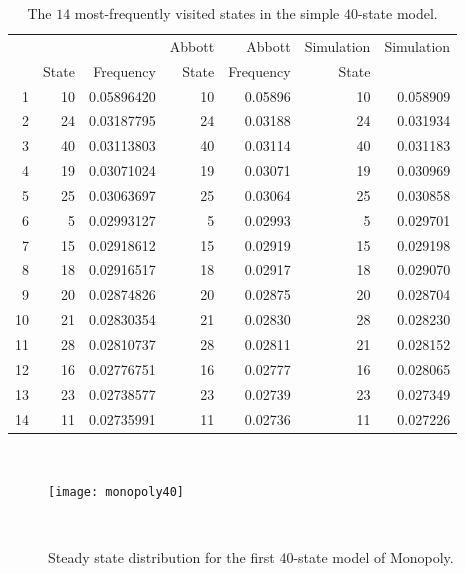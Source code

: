 \documentclass[12pt]{article}
\begin{document}
\begin{table}
    \centering
    \begin{tabular}{rrrrrrr}
           &       &            & Abbott & Abbott    & Simulation & Simulation \\ 
           & State & Frequency  & State  & Frequency & State      &            \\ 
        1  & 10    & 0.05896420 & 10     & 0.05896   & 10         & 0.058909   \\ 
        2  & 24    & 0.03187795 & 24     & 0.03188   & 24         & 0.031934   \\ 
        3  & 40    & 0.03113803 & 40     & 0.03114   & 40         & 0.031183   \\ 
        4  & 19    & 0.03071024 & 19     & 0.03071   & 19         & 0.030969   \\ 
        5  & 25    & 0.03063697 & 25     & 0.03064   & 25         & 0.030858   \\ 
        6  & 5     & 0.02993127 & 5      & 0.02993   & 5          & 0.029701   \\ 
        7  & 15    & 0.02918612 & 15     & 0.02919   & 15         & 0.029198   \\ 
        8  & 18    & 0.02916517 & 18     & 0.02917   & 18         & 0.029070   \\ 
        9  & 20    & 0.02874826 & 20     & 0.02875   & 20         & 0.028704   \\ 
        10 & 21    & 0.02830354 & 21     & 0.02830   & 28         & 0.028230   \\ 
        11 & 28    & 0.02810737 & 28     & 0.02811   & 21         & 0.028152   \\ 
        12 & 16    & 0.02776751 & 16     & 0.02777   & 16         & 0.028065   \\ 
        13 & 23    & 0.02738577 & 23     & 0.02739   & 23         & 0.027349   \\ 
        14 & 11    & 0.02735991 & 11     & 0.02736   & 11         & 0.027226   \\ 
    \end{tabular}
    \caption{The \( 14 \) most-frequently visited states in the simple \(
    40 \)-state model.}~%
    \label{tab:monopoly:freq40}
\end{table}

\begin{figure}
    \centering
    \texttt{[image: monopoly40]}
    \caption{Steady state distribution for the first \( 40 \)-state
    model of Monopoly.}~%
    \label{fig:monopoly:monopoly40}
\end{figure}
\end{document}
